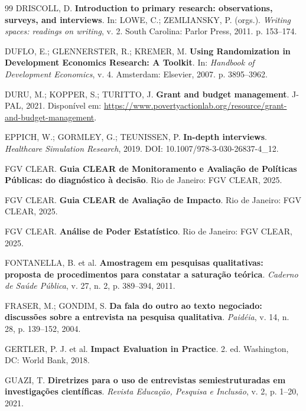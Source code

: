 \documentclass[12pt, a4paper, openany]{book}
\begin{document}
\begin{thebibliography}{99}
DRISCOLL, D. \textbf{Introduction to primary research: observations, surveys, and interviews}. In: LOWE, C.; ZEMLIANSKY, P. (orgs.). \textit{Writing spaces: readings on writing}, v. 2. South Carolina: Parlor Press, 2011. p. 153--174.

DUFLO, E.; GLENNERSTER, R.; KREMER, M. \textbf{Using Randomization in Development Economics Research: A Toolkit}. In: \textit{Handbook of Development Economics}, v. 4. Amsterdam: Elsevier, 2007. p. 3895--3962.

DURU, M.; KOPPER, S.; TURITTO, J. \textbf{Grant and budget management}. J-PAL, 2021. Dispon\'ivel em: \url{https://www.povertyactionlab.org/resource/grant-and-budget-management}.

EPPICH, W.; GORMLEY, G.; TEUNISSEN, P. \textbf{In-depth interviews}. \textit{Healthcare Simulation Research}, 2019. DOI: 10.1007/978-3-030-26837-4\_12.

FGV CLEAR. \textbf{Guia CLEAR de Monitoramento e Avalia\c{c}\~ao de Pol\'iticas P\'ublicas: do diagn\'ostico \`a decis\~ao}. Rio de Janeiro: FGV CLEAR, 2025.

FGV CLEAR. \textbf{Guia CLEAR de Avalia\c{c}\~ao de Impacto}. Rio de Janeiro: FGV CLEAR, 2025.

FGV CLEAR. \textbf{An\'alise de Poder Estat\'istico}. Rio de Janeiro: FGV CLEAR, 2025.

FONTANELLA, B. et al. \textbf{Amostragem em pesquisas qualitativas: proposta de procedimentos para constatar a satura\c{c}\~ao te\'orica}. \textit{Caderno de Sa\'ude P\'ublica}, v. 27, n. 2, p. 389--394, 2011.

FRASER, M.; GONDIM, S. \textbf{Da fala do outro ao texto negociado: discuss\~oes sobre a entrevista na pesquisa qualitativa}. \textit{Paid\'eia}, v. 14, n. 28, p. 139--152, 2004.

GERTLER, P. J. et al. \textbf{Impact Evaluation in Practice}. 2. ed. Washington, DC: World Bank, 2018.

GUAZI, T. \textbf{Diretrizes para o uso de entrevistas semiestruturadas em investiga\c{c}\~oes cient\'ificas}. \textit{Revista Educa\c{c}\~ao, Pesquisa e Inclus\~ao}, v. 2, p. 1--20, 2021.


\end{thebibliography}
\end{document}

